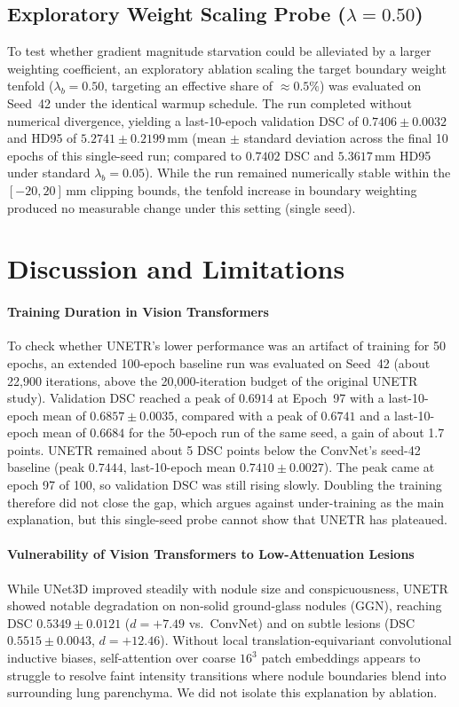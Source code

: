 \documentclass[10pt, a4paper, twocolumn]{article}
\begin{document}
\subsection{Exploratory Weight Scaling Probe (\texorpdfstring{$\lambda = 0.50$}{lambda = 0.50})}
To test whether gradient magnitude starvation could be alleviated by a larger weighting coefficient, an exploratory ablation scaling the target boundary weight tenfold ($\lambda_b = 0.50$, targeting an effective share of $\approx 0.5\%$) was evaluated on Seed~42 under the identical warmup schedule. The run completed without numerical divergence, yielding a last-10-epoch validation DSC of $0.7406 \pm 0.0032$ and HD95 of $5.2741 \pm 0.2199$\,mm (mean $\pm$ standard deviation across the final 10 epochs of this single-seed run; compared to $0.7402$ DSC and $5.3617$\,mm HD95 under standard $\lambda_b = 0.05$). While the run remained numerically stable within the $[-20, 20]$\,mm clipping bounds, the tenfold increase in boundary weighting produced no measurable change under this setting (single seed).

\section{Discussion and Limitations}

\paragraph{Training Duration in Vision Transformers}
To check whether UNETR's lower performance was an artifact of training for 50 epochs, an extended 100-epoch baseline run was evaluated on Seed~42 (about 22,900 iterations, above the 20,000-iteration budget of the original UNETR study). Validation DSC reached a peak of $0.6914$ at Epoch~97 with a last-10-epoch mean of $0.6857 \pm 0.0035$, compared with a peak of $0.6741$ and a last-10-epoch mean of $0.6684$ for the 50-epoch run of the same seed, a gain of about 1.7 points. UNETR remained about 5 DSC points below the ConvNet's seed-42 baseline (peak $0.7444$, last-10-epoch mean $0.7410 \pm 0.0027$). The peak came at epoch 97 of 100, so validation DSC was still rising slowly. Doubling the training therefore did not close the gap, which argues against under-training as the main explanation, but this single-seed probe cannot show that UNETR has plateaued.

\paragraph{Vulnerability of Vision Transformers to Low-Attenuation Lesions}
While UNet3D improved steadily with nodule size and conspicuousness, UNETR showed notable degradation on non-solid ground-glass nodules (GGN), reaching DSC $0.5349 \pm 0.0121$ ($d = +7.49$ vs.\ ConvNet) and on subtle lesions (DSC $0.5515 \pm 0.0043$, $d = +12.46$). Without local translation-equivariant convolutional inductive biases, self-attention over coarse $16^3$ patch embeddings appears to struggle to resolve faint intensity transitions where nodule boundaries blend into surrounding lung parenchyma. We did not isolate this explanation by ablation.
\end{document}
